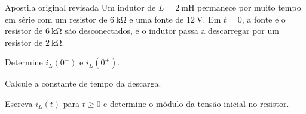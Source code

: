 \begin{questao}[3]{Apostila original revisada}
Um indutor de $L=\SI{2}{\milli\henry}$ permanece por muito tempo em série com um
resistor de $\SI{6}{\kilo\ohm}$ e uma fonte de $\SI{12}{\volt}$. Em $t=0$, a fonte
e o resistor de $\SI{6}{\kilo\ohm}$ são desconectados, e o indutor passa a descarregar
por um resistor de $\SI{2}{\kilo\ohm}$.
\begin{itensq}
\item Determine $i_L(0^-)$ e $i_L(0^+)$.
\item Calcule a constante de tempo da descarga.
\item Escreva $i_L(t)$ para $t\ge 0$ e determine o módulo da tensão inicial no resistor.
\end{itensq}
\end{questao}



\gabarito[10.2 Indutores]
